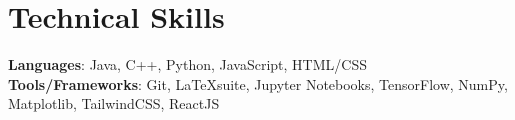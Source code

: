 \documentclass[letterpaper,11pt]{article}
\makeatletter
\newcommand{\resumeItem}[1]{
  \item\small{
    {#1 \vspace{-1pt}}
  }
}
\newcommand{\resumeProjectHeading}[2]{
    \item
    \begin{tabular*}{0.97\textwidth}{l@{\extracolsep{\fill}}r}
      \small#1 & #2 \\
    \end{tabular*}\vspace{-4pt}
}
\newcommand{\resumeSubHeadingListStart}{\begin{itemize}[leftmargin=0.15in, label={}]}
\newcommand{\resumeSubHeadingListEnd}{\end{itemize}}
\newcommand{\resumeItemListStart}{\begin{itemize}}
\newcommand{\resumeItemListEnd}{\end{itemize}\vspace{-5pt}}
\makeatother
\begin{document}
    \section{Technical Skills}
    \begin{itemize}[leftmargin=0.15in, label={}]
      \small{\item{
        \textbf{Languages}{: Java, C++, Python, JavaScript, HTML/CSS} \\
        \textbf{Tools/Frameworks}{: Git, \LaTeX\hspace{0.1cm}suite, Jupyter Notebooks, TensorFlow, NumPy, Matplotlib, TailwindCSS, ReactJS
        }
      }}
    \end{itemize}



\end{document}
